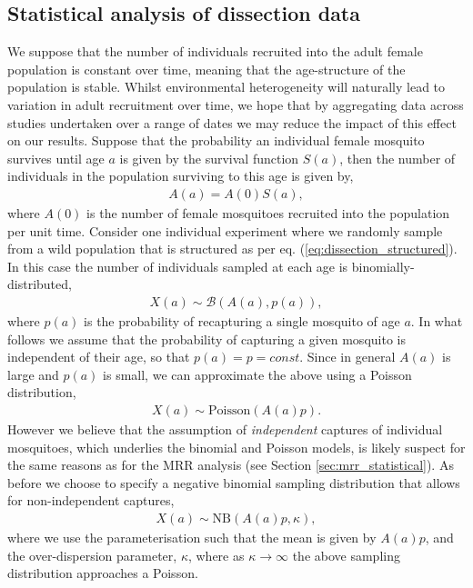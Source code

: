 \documentclass[12pt]{article}
\begin{document}
{\subsection{Statistical analysis of dissection data}\label{sec:dissection_dissectionStats}
We suppose that the number of individuals recruited into the adult female population is constant over time, meaning that the age-structure of the population is stable. Whilst environmental heterogeneity will naturally lead to variation in adult recruitment over time, we hope that by aggregating data across studies undertaken over a range of dates we may reduce the impact of this effect on our results. Suppose that the probability an individual female mosquito survives until age $a$ is given by the survival function $S(a)$, then the number of individuals in the population surviving to this age is given by,
%
\begin{align}\label{eq:dissection_structured}
A(a) = A(0) S(a),
\end{align}
%
where $A(0)$ is the number of female mosquitoes recruited into the population per unit time. Consider one individual experiment where we randomly sample from a wild population that is structured as per eq. (\ref{eq:dissection_structured}). In this case the number of individuals sampled at each age is binomially-distributed,
%
\begin{align}
X(a) \sim \mathcal{B}(A(a),p(a)),
\end{align} 
%
where $p(a)$ is the probability of recapturing a single mosquito of age $a$. In what follows we assume that the probability of capturing a given mosquito is independent of their age, so that $p(a)=p=const$. Since in general $A(a)$ is large and $p(a)$ is small, we can approximate the above using a Poisson distribution,
%
\begin{align}
X(a) \sim \text{Poisson}(A(a)p).
\end{align}
%
However we believe that the assumption of \textit{independent} captures of individual mosquitoes, which underlies the binomial and Poisson models, is likely suspect for the same reasons as for the MRR analysis (see Section \ref{sec:mrr_statistical}). As before we choose to specify a negative binomial sampling distribution that allows for non-independent captures,
%
\begin{align}
X(a) \sim \text{NB}(A(a)p,\kappa),
\end{align} 
%
where we use the parameterisation such that the mean is given by $A(a)p$, and the over-dispersion parameter, $\kappa$, where as $\kappa\rightarrow \infty$ the above sampling distribution approaches a Poisson.

}
\end{document}
